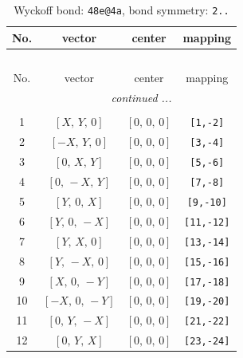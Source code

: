 \documentclass[fleqn,8pt]{jsarticle}
\begin{document}
\begin{longtable}{cccc}
\caption{Wyckoff bond: {\tt 48e@4a}, bond symmetry: {\tt 2..}}
 \\
 \hline \hline
No. & vector & center & mapping \\ \hline \endfirsthead

\multicolumn{3}{l}{\tablename\ \thetable{}} \\
 \hline \hline
No. & vector & center & mapping \\ \hline \endhead

 \hline \hline
\multicolumn{3}{r}{\footnotesize\it continued ...} \\ \endfoot

 \hline \hline
\multicolumn{3}{r}{} \\ \endlastfoot

1 & $\left[ X,\, Y,\, 0 \right]$ & $\left[ 0,\, 0,\, 0 \right]$ & {\tt [1,-2]} \\ \hline
2 & $\left[ - X,\, Y,\, 0 \right]$ & $\left[ 0,\, 0,\, 0 \right]$ & {\tt [3,-4]} \\ \hline
3 & $\left[ 0,\, X,\, Y \right]$ & $\left[ 0,\, 0,\, 0 \right]$ & {\tt [5,-6]} \\ \hline
4 & $\left[ 0,\, - X,\, Y \right]$ & $\left[ 0,\, 0,\, 0 \right]$ & {\tt [7,-8]} \\ \hline
5 & $\left[ Y,\, 0,\, X \right]$ & $\left[ 0,\, 0,\, 0 \right]$ & {\tt [9,-10]} \\ \hline
6 & $\left[ Y,\, 0,\, - X \right]$ & $\left[ 0,\, 0,\, 0 \right]$ & {\tt [11,-12]} \\ \hline
7 & $\left[ Y,\, X,\, 0 \right]$ & $\left[ 0,\, 0,\, 0 \right]$ & {\tt [13,-14]} \\ \hline
8 & $\left[ Y,\, - X,\, 0 \right]$ & $\left[ 0,\, 0,\, 0 \right]$ & {\tt [15,-16]} \\ \hline
9 & $\left[ X,\, 0,\, - Y \right]$ & $\left[ 0,\, 0,\, 0 \right]$ & {\tt [17,-18]} \\ \hline
10 & $\left[ - X,\, 0,\, - Y \right]$ & $\left[ 0,\, 0,\, 0 \right]$ & {\tt [19,-20]} \\ \hline
11 & $\left[ 0,\, Y,\, - X \right]$ & $\left[ 0,\, 0,\, 0 \right]$ & {\tt [21,-22]} \\ \hline
12 & $\left[ 0,\, Y,\, X \right]$ & $\left[ 0,\, 0,\, 0 \right]$ & {\tt [23,-24]} \\
\end{longtable}
\renewcommand{\arraystretch}{1.2}
\end{document}
